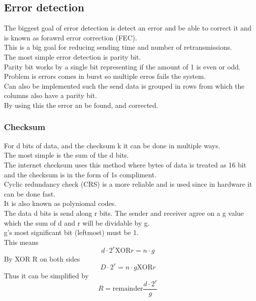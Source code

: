 \documentclass[12pt, a4paper]{article}
\begin{document}
		\subsection{Error detection}
			The biggest goal of error detection is detect an error and be able to correct it and is known as forawrd error correction (FEC).\\
			This is a big goal for reducing sending time and number of retransmissions.\\[4mm]
			The most simple error detection is parity bit.\\
			Parity bit works by a single bit representing if the amount of 1 is even or odd.\\
			Problem is errors comes in burst so multiple erros fails the system.\\
			Can also be implemented such the send data is grouped in rows from which the columns also have a parity bit.\\
			By using this the error an be found, and corrected.\\
			\subsubsection{Checksum}
				For d bits of data, and the checksum k it can be done in multiple ways.\\
				The most simple is the sum of the d bits.\\
				The internet checksum uses this method where bytes of data is treated as 16 bit and the checksum is in the form of 1s compliment.\\
				Cyclic redundancy check (CRS) is a more reliable and is used since in hardware it can be done fast.\\
				It is also known as polyniomal codes.\\
				The data d bits is send along r bits. The sender and receiver agree on a g value which the sum of d and r will be dividable by g.\\
				g's most significant bit (leftmost) must be 1.\\
				This means\\
				$$d\cdot 2^r\text{XOR}r=n\cdot g$$
				By XOR R on both sides
				$$D\cdot 2^r=n\cdot g\text{XOR} r$$
				Thus it can be simplified by
				$$R=\text{remainder}\frac{d\cdot 2^r}{g}$$
\end{document}
